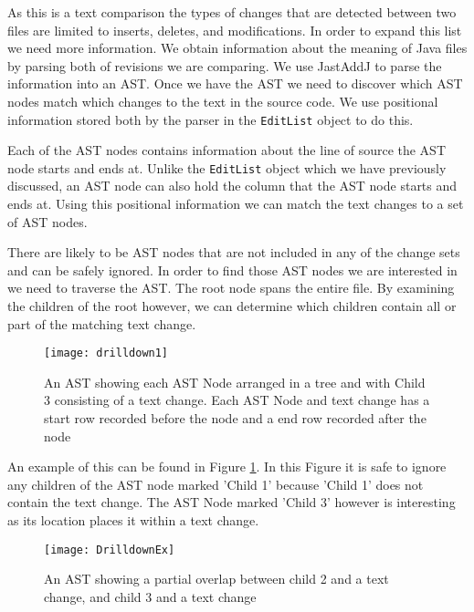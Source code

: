 As this is a text comparison the types of changes that are detected between two files are limited to inserts, deletes, and modifications. In order to expand this list we need more information.  We obtain information about the meaning of Java files by parsing both of revisions we are comparing.  We use JastAddJ \cite{Oqvist2013} to parse the information into an AST. Once we have the AST we need to discover which AST nodes match which changes to the text in the source code. We use positional information stored both by the parser in the \lstinline{EditList} object to do this.

Each of the AST nodes contains information about the line of source the AST node starts and ends at.  Unlike the \lstinline{EditList} object which we have previously discussed, an AST node can also hold the column that the AST node starts and ends at.  Using this positional information we can match the text changes to a set of AST nodes.

There are likely to be AST nodes that are not included in any of the change sets and can be safely ignored. In order to find those AST nodes we are interested in we need to traverse the AST.  The root node spans the entire file.  By examining the children of the root however, we can determine which children contain all or part of the matching text change.

\begin{figure}[!t]
 \begin{center}
  \texttt{[image: drilldown1]}
 \end{center}
 \caption{An AST showing each AST Node arranged in a tree and with Child 3 consisting of a text change.  Each AST Node and text change has a start row recorded before the node and a end row recorded after the node}
 \label{fig:findingASTNode}
\end{figure}

An example of this can be found in Figure \ref{fig:findingASTNode}.  In this Figure it is safe to ignore any children of the AST node marked 'Child 1' because 'Child 1' does not contain the text change.  The AST Node marked 'Child 3' however is interesting as its location places it within a text change. 


\begin{figure}[!t]
 \begin{center}
  \texttt{[image: DrilldownEx]}
 \end{center}
 \caption{An AST showing a partial overlap between child 2 and a text change, and child 3 and a text change}
 \label{fig:troubleASTNode}
\end{figure}

